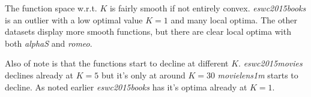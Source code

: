 
\FloatBarrier

The function space w.r.t. $K$ is fairly smooth if not entirely convex. \textit{eswc2015books} is an outlier with a low optimal value $K = 1$ and many local optima. The other datasets display more smooth functions, but there are clear local optima with both \textit{alphaS} and \textit{romeo}.

Also of note is that the functions start to decline at different $K$. \textit{eswc2015movies} declines already at $K = 5$ but it's only at around $K = 30$ \textit{movielens1m} starts to decline. As noted earlier \textit{eswc2015books} has it's optima already at $K = 1$.

